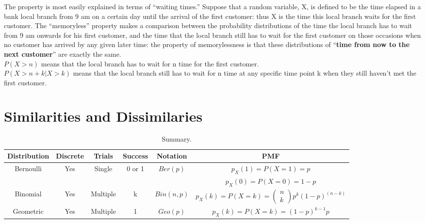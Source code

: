 \documentclass{article} %
\begin{document}
The property is most easily explained in terms of ``waiting times.'' Suppose that a random variable, X, is defined to be the time elapsed in a bank local branch from 9 am on a certain day until the arrival of the first customer: thus X is the time this local branch waits for the first customer. The ``memoryless'' property makes a comparison between the probability distributions of the time the local branch has to wait from 9 am onwards for his first customer, and the time that the local branch still has to wait for the first customer on those occasions when no customer has arrived by any given later time: the property of memorylessness is that these distributions of ``{\bf time from now to the next customer}'' are exactly the same. \\
$P(X > n)$ means that the local branch has to wait for n time for the first customer. \\
$P(X > n + k | X > k)$ means that the local branch still has to wait for n time at any specific time point k when they still haven't met the first customer. 

\newpage 
\section*{Similarities and Dissimilaries}
\begin{table}[h!]
\begin{center}
\renewcommand{\arraystretch}{1.5}
\begin{tabular}{|c|c|c|c|c|c|} \hline
Distribution & Discrete & Trials & Success  & Notation & PMF \\ \hline
\multirow{2}{*}{Bernoulli} & \multirow{2}{*}{Yes} & \multirow{2}{*}{Single} & \multirow{2}{*}{0 or 1}  & \multirow{2}{*}{$Ber(p)$} & {$p_X(1) = P(X=1) = p$} \\
& & & & & $p_X(0) = P(X=0) = 1-p$ \\ \hline
Binomial &  Yes & Multiple & k & $Bin(n, p)$ & $p_X(k) = P(X=k) = \left( \begin{array}{c} n \\ k \end{array} \right) p^k (1-p)^{(n-k)}$ \\ \hline
Geometric & Yes & Multiple & 1 & $Geo(p)$ & $p_X(k)=P(X=k) = (1-p)^{k-1}p$\\
\hline
\end{tabular}
\caption{Summary.}
\label{Ta:comp}
\end{center}
\end{table}
\end{document}
